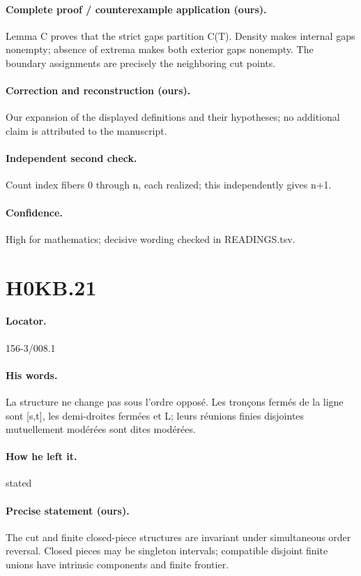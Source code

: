 \paragraph{Complete proof / counterexample application (ours).} Lemma C proves that the strict gaps partition C(T). Density makes internal gaps nonempty; absence of extrema makes both exterior gaps nonempty. The boundary assignments are precisely the neighboring cut points.

\paragraph{Correction and reconstruction (ours).} Our expansion of the displayed definitions and their hypotheses; no additional claim is attributed to the manuscript.

\paragraph{Independent second check.} Count index fibers 0 through n, each realized; this independently gives n+1.

\paragraph{Confidence.} High for mathematics; decisive wording checked in READINGS.tsv.

\section*{H0KB.21}\label{statement:H0KB.21}
\paragraph{Locator.} 156-3/008.1

\paragraph{His words.} La structure ne change pas sous l’ordre opposé. Les tronçons fermés de la ligne sont [s,t], les demi-droites fermées et L; leurs réunions finies disjointes mutuellement modérées sont dites modérées.

\paragraph{How he left it.} stated

\paragraph{Precise statement (ours).} The cut and finite closed-piece structures are invariant under simultaneous order reversal. Closed pieces may be singleton intervals; compatible disjoint finite unions have intrinsic components and finite frontier.

